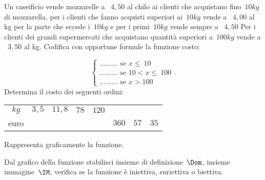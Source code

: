 \begin{esercizio}
\label{ese:D.63}
Un caseificio vende mozzarelle a \officialeuro\ $4,50$ al chilo ai clienti che 
acquistano fino~$10\unit{kg}$ di mozzarella, per i clienti che
fanno acquisti superiori ai~$10\unit{kg}$ vende a \officialeuro\ $4,00$ al kg 
per la parte che eccede i~$10\unit{kg}$ e per i primi~$10\unit{kg}$
vende sempre a \officialeuro\ $4,50$ Per i clienti dei grandi supermercati che 
acquistano quantità superiori a~$100\unit{kg}$ vende a \officialeuro\ $3,50$
al kg. Codifica con opportune formule la funzione costo:

\[\left\{\begin{array}{l}
\ldots\ldots\ldots \text{ se } x \le~10\\
\ldots\ldots\ldots \text{ se } 10< x \le~100\\
\ldots\ldots\ldots \text{ se } x > 100\end{array}\right..
\]
Determina il costo dei seguenti ordini:
\begin{center}
 \begin{tabular}{cccccccc}
  \toprule
  $\unit{kg}$&$3,5$&$11,8$&$78$&$120$& & &\\
  euro& & & & &$360$&$57$&$35$\\
  \bottomrule
 \end{tabular}
\end{center}

Rappresenta graficamente la funzione.
\end{esercizio}

\begin{esercizio}
\label{ese:D.64}
Dal grafico della funzione stabilisci insieme di definizione~$\Dom$, insieme 
immagine~$\IM$, verifica se la funzione è iniettiva, suriettiva o biettiva.
\begin{center}
 
\end{center}

\end{esercizio}

